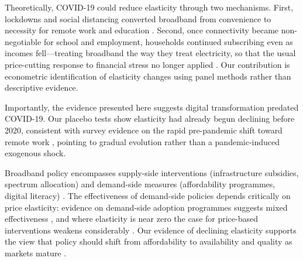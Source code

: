 Theoretically, COVID-19 could reduce elasticity through two mechanisms. 
First, lockdowns and social distancing converted broadband from convenience to 
necessity for remote work and education \citep{brynjolfsson2020covid}. 
Second, once connectivity became non-negotiable for school and employment, households continued subscribing even as incomes fell---treating broadband the way they treat electricity, so that the usual price-cutting response to financial stress no longer applied \citep{oecd2021covid}. Our contribution is econometric identification of elasticity changes using panel methods rather than descriptive evidence.

Importantly, the evidence presented here suggests digital transformation predated COVID-19. Our placebo tests show elasticity had already begun declining before 2020, consistent with survey evidence on the rapid pre-pandemic shift toward remote work \citep{brynjolfsson2020covid}, pointing to gradual evolution rather than a pandemic-induced exogenous shock.

Broadband policy encompasses supply-side interventions (infrastructure subsidies, spectrum allocation) and demand-side measures (affordability programmes, digital literacy) \citep{oecd2020broadband}. The effectiveness of demand-side policies depends critically on price elasticity: evidence on demand-side adoption programmes suggests mixed effectiveness \citep{hauge2010demand}, and where elasticity is near zero the case for price-based interventions weakens considerably \citep{guermazi2021digital}. Our evidence of declining elasticity supports the view that policy should shift from affordability to availability and quality as markets mature \citep{oecd2020broadband, ecorys2013evaluation}.
